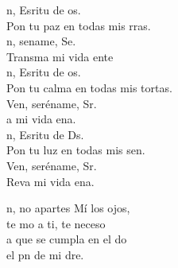 \documentclass[12pt]{article}
\begin{document}
\begin{multicols*}{2}
\begin{cancion}%
	n, Esritu de os. \\
	Pon tu paz en todas mis rras.\\
	n, sename, Se. \\
	Transma mi vida ente\\
	n, Esritu de os. \\
	Pon tu calma en todas mis tortas.\\
	Ven, seréname, Sr.\\
	a mi vida ena.\\
	n, Esritu de Ds. \\
	Pon tu luz en todas mis sen.\\
	Ven, seréname, Sr.\\
	Reva mi vida ena.\\
\end{cancion}%

\begin{cancion}%
	n, no apartes  Mí los ojos,\\
	te mo a ti, te neceso\\
	a que se cumpla en el do\\
	el pn de mi dre.\\
\end{cancion}%


\end{multicols*}
\end{document}
